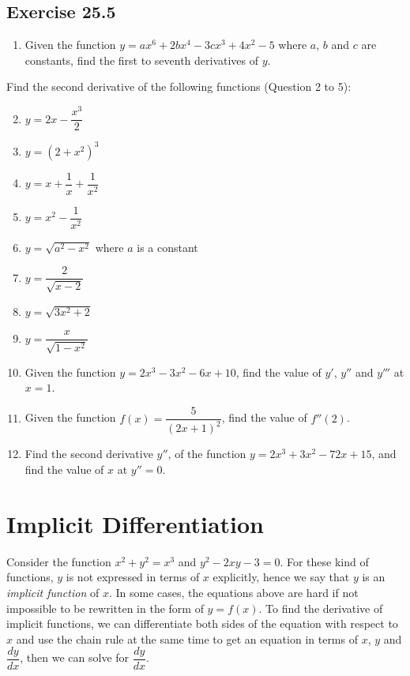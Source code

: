 \documentclass[12pt]{report}
\begin{document}
\subsection{Exercise 25.5}
\setlength{\columnseprule}{1pt}
\setlength{\columnsep}{24pt}
\begin{multicols}{2}
  \begin{enumerate}
    \item Given the function $y=a x^{6}+2b x^{4}-3c x^{3}+4x^{2}-5$ where $a$, $b$ and
          $c$ are constants, find the first to seventh derivatives of $y$.
  \end{enumerate}
  \noindent Find the second derivative of the following functions (Question 2 to 5):
  \begin{enumerate}
    \setcounter{enumi}{1}
    \item $y=2x-{\dfrac{x^{3}}{2}}$
    \item $y={\left(2+x^{2}\right)}^{3}$
    \item $y=x+{\dfrac{1}{x}}+{\dfrac{1}{x^{2}}}$
    \item $y=x^{2}-{\dfrac{1}{x^{2}}}$
    \item $y={\sqrt{a^{2}-x^{2}}}$ where $a$ is a constant
    \item $y={\dfrac{2}{\sqrt{x-2}}}$
    \item $y={\sqrt{3x^{2}+2}}$
    \item $y={\dfrac{x}{\sqrt{1-x^{2}}}}$
    \item Given the function $y = 2x^3 - 3x^2 - 6x + 10$, find the value of $y'$, $y''$
          and $y'''$ at $x = 1$.
    \item Given the function $f (x) = \dfrac{5}{{(2x + 1)}^2}$, find the value of $f''
            (2)$.
    \item Find the second derivative $y''$, of the function $y = 2x^3 + 3x^2 - 72x + 15$,
          and find the value of $x$ at $y'' = 0$.
  \end{enumerate}
\end{multicols}

\section{Implicit Differentiation}

Consider the function $x^2 + y^2 = x^3$ and $y^2 - 2xy - 3 = 0$. For these kind
of functions, $y$ is not expressed in terms of $x$ explicitly, hence we say
that $y$ is an \textit{implicit function} of $x$. In some cases, the equations
above are hard if not impossible to be rewritten in the form of $y = f (x)$. To
find the derivative of implicit functions, we can differentiate both sides of
the equation with respect to $x$ and use the chain rule at the same time to get
an equation in terms of $x$, $y$ and $\dfrac{dy}{dx}$, then we can solve for
$\dfrac{dy}{dx}$.
\end{document}
